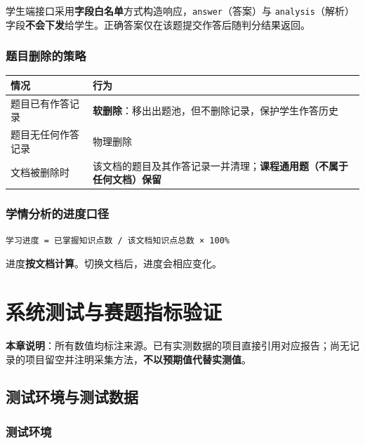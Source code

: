 \documentclass[UTF8,a4paper,11pt]{ctexrep}
\begin{document}
学生端接口采用\textbf{字段白名单}方式构造响应，\texttt{answer}（答案）与 \texttt{analysis}（解析）字段\textbf{不会下发}给学生。正确答案仅在该题提交作答后随判分结果返回。


\subsection{题目删除的策略}

\begin{center}
\small
\begin{tabularx}{\linewidth}{@{}XX@{}}
\toprule
情况 & 行为 \\
\midrule
题目已有作答记录 & \textbf{软删除}：移出出题池，但不删除记录，保护学生作答历史 \\
题目无任何作答记录 & 物理删除 \\
文档被删除时 & 该文档的题目及其作答记录一并清理；\textbf{课程通用题（不属于任何文档）保留} \\
\bottomrule
\end{tabularx}
\end{center}

\subsection{学情分析的进度口径}

\begin{Verbatim}[breaklines=true,breakanywhere=true,fontsize=\small,frame=single,framesep=4pt,rulecolor=\color{codeframe}]
学习进度 = 已掌握知识点数 / 该文档知识点总数 × 100%
\end{Verbatim}

进度\textbf{按文档计算}。切换文档后，进度会相应变化。


\chapter{系统测试与赛题指标验证}

\begin{notebox}
\textbf{本章说明}：所有数值均标注来源。已有实测数据的项目直接引用对应报告；尚无记录的项目留空并注明采集方法，\textbf{不以预期值代替实测值}。

\end{notebox}


\section{测试环境与测试数据}


\subsection{测试环境}
\end{document}
